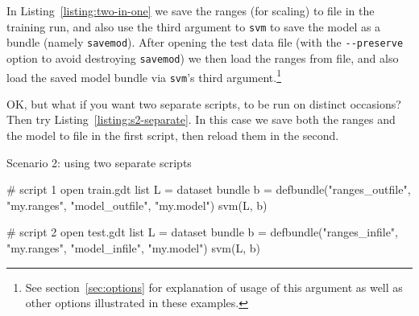 \documentclass{article}
\begin{document}
In Listing~\ref{listing:two-in-one} we save the ranges (for scaling)
to file in the training run, and also use the third argument to
\texttt{svm} to save the model as a bundle (namely
\texttt{savemod}). After opening the test data file (with the
\verb|--preserve| option to avoid destroying \texttt{savemod}) we then
load the ranges from file, and also load the saved model bundle via
\texttt{svm}'s third argument.\footnote{See section~\ref{sec:options}
  for explanation of usage of this argument as well as other options
  illustrated in these examples.}

OK, but what if you want two separate scripts, to be run on distinct
occasions? Then try Listing~\ref{listing:s2-separate}. In this case we
save both the ranges and the model to file in the first script, then
reload them in the second.

\begin{script}[htbp]
  \caption{Scenario 2: using two separate scripts}
  \label{listing:s2-separate}
\begin{scode}
# script 1
open train.gdt
list L = dataset
bundle b = defbundle("ranges_outfile", "my.ranges", "model_outfile", "my.model")
svm(L, b)

# script 2
open test.gdt
list L = dataset
bundle b = defbundle("ranges_infile", "my.ranges", "model_infile", "my.model")
svm(L, b)
\end{scode}
\end{script}

\end{document}
